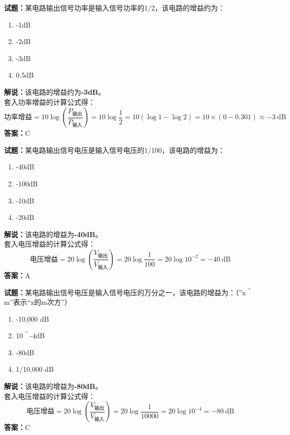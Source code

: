 \documentclass{ctexbook}
\begin{document}
\bigskip




\noindent\textbf{试题：}某电路输出信号功率是输入信号功率的1/2，该电路的增益约为：
\begin{enumerate}[leftmargin=3em]
\item -1dB
\item -2dB
\item -3dB
\item 0.5dB
\end{enumerate}
\noindent\textbf{解说：}该电路的增益约为\textbf{-3dB}。\\
套入功率增益的计算公式得：
$$\mbox{功率增益}=10 \log \left( {\frac{P_{ \mbox{输出} }}{P_{ \mbox{输入} }}} \right)=10 \log \frac{1}{2}=10 \left( \log 1 - \log 2 \right) = 10 \times \left( 0 - 0.301 \right) \approx -3 \ \mathrm{dB}$$
\noindent\textbf{答案：}C

\bigskip




\noindent\textbf{试题：}某电路输出信号电压是输入信号电压的1/100，该电路的增益为：
\begin{enumerate}[leftmargin=3em]
\item -40dB
\item -100dB
\item -10dB
\item -20dB
\end{enumerate}
\noindent\textbf{解说：}该电路的增益为\textbf{-40dB}。\\
套入电压增益的计算公式得：
$$\mbox{电压增益}=20 \log \left( {\frac{V_{ \mbox{输出} }}{V_{ \mbox{输入} }}} \right)=20 \log \frac{1}{100}=20 \log 10^{-2}= -40 \ \mathrm{dB}$$
\noindent\textbf{答案：}A

\bigskip




\noindent\textbf{试题：}某电路输出信号电压是输入信号电压的万分之一，该电路的增益为：（”x＾m”表示“x的m次方”）
\begin{enumerate}[leftmargin=3em]
\item -10,000 dB
\item 10＾-4dB
\item -80dB
\item 1/10,000 dB
\end{enumerate}
\noindent\textbf{解说：}该电路的增益为\textbf{-80dB}。\\
套入电压增益的计算公式得：
$$\mbox{电压增益}=20 \log \left( {\frac{V_{ \mbox{输出} }}{V_{ \mbox{输入} }}} \right)=20 \log \frac{1}{10000}=20 \log 10^{-4}= -80 \ \mathrm{dB}$$
\noindent\textbf{答案：}C
\end{document}
